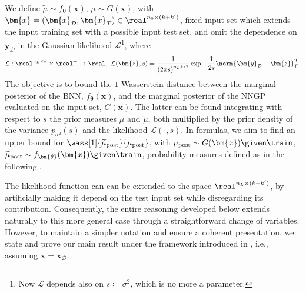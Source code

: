We define $\widetilde{\mu} \sim f_{\bm{\theta}}(\bm{x})$, $\mu \sim G(\bm{x})$, with $\bm{x} = (\bm{x}_{\mathcal{D}}, \bm{x}_{\mathcal{T}}) \in \real^{n_0 \times (k + k')}$, fixed input set which extends the input training set with a possible input test set, and omit the dependence on $\bm{y}_{\mathcal{D}}$ in the Gaussian likelihood $\mathcal{L}$\footnote{Now $\mathcal{L}$ depends also on $s \coloneqq \sigma^2$, which is no more a parameter.}, where
\begin{equation} \label{eq:likelihood}
    \mathcal{L}: \real^{n_L \times k} \times \real^{+} \to \real, \ \mathcal{L}(\bm{z}, s) = \frac{1}{\left(2 \pi s\right)^{n_L k / 2}} \exp{-\frac{1}{2 s} \norm{\bm{y}_{\mathcal{D}} - \bm{z}}_F^2}.
\end{equation}
The objective is to bound the $1$-Wasserstein distance between the marginal posterior of the BNN, $f_{\bm{\theta}}(\bm{x})$, and the marginal posterior of the NNGP evaluated on the input set, $G(\bm{x})$. The latter can be found integrating with respect to $s$ the prior measures $\mu$ and $\widetilde{\mu}$, both multiplied by the prior density of the variance $p_{\sigma^2}(s)$ and the likelihood $\mathcal{L}(\cdot, s)$.
In formulas, we aim to find an upper bound for $\wass[1]{\widetilde{\mu}_{\mathrm{post}}}{\mu_{\mathrm{post}}}$, with $\mu_{\mathrm{post}} \sim G(\bm{x}) \given \train$, $\widetilde{\mu}_{\mathrm{post}} \sim f_{\bm{\theta}}(\bm{x}) \given \train$, probability measures defined as in the following .

\begin{remark}
    The likelihood function can can be extended to the space $\real^{n_L \times (k + k')}$, by artificially making it depend on the test input set while disregarding its contribution. 
    Consequently, the entire reasoning developed below extends naturally to this more general case through a straightforward change of variables. 
    However, to maintain a simpler notation and ensure a coherent presentation, we state and prove our main result under the framework introduced in , i.e., assuming $\bm{x} = \bm{x}_{\mathcal{D}}$.
\end{remark}

